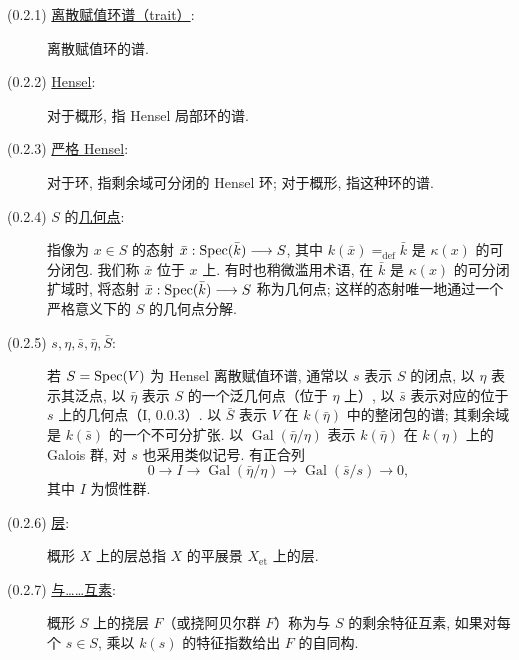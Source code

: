 \begin{description}
\item[(0.2.1) \underline{离散赋值环谱（trait）}:]
离散赋值环的谱.

\item[(0.2.2) \underline{Hensel}:]
对于概形, 指 Hensel 局部环的谱.

\item[(0.2.3) \underline{严格 Hensel}:]
对于环, 指剩余域可分闭的 Hensel 环; 对于概形, 指这种环的谱.

\item[(0.2.4) $S$ 的\underline{几何点}:]
指像为 $x\in S$ 的态射 $\bar x:\operatorname{Spec}(\bar k)\longrightarrow S$, 其中 $k(\bar x)=_{\mathrm{def}}\bar k$ 是 $\kappa(x)$ 的可分闭包. 我们称 $\bar x$ 位于 $x$ 上. 有时也稍微滥用术语, 在 $\bar k$ 是 $\kappa(x)$ 的可分闭扩域时, 将态射 $\bar x:\operatorname{Spec}(\bar k)\longrightarrow S$ 称为几何点; 这样的态射唯一地通过一个严格意义下的 $S$ 的几何点分解.

\item[(0.2.5) $s,\eta,\bar s,\bar\eta,\bar S$:]
若 $S=\operatorname{Spec}(V)$ 为 Hensel 离散赋值环谱, 通常以 $s$ 表示 $S$ 的闭点, 以 $\eta$ 表示其泛点, 以 $\bar\eta$ 表示 $S$ 的一个泛几何点（位于 $\eta$ 上）, 以 $\bar s$ 表示对应的位于 $s$ 上的几何点（I, 0.0.3）. 以 $\bar S$ 表示 $V$ 在 $k(\bar\eta)$ 中的整闭包的谱; 其剩余域是 $k(\bar s)$ 的一个不可分扩张. 以 $\operatorname{Gal}(\bar\eta/\eta)$ 表示 $k(\bar\eta)$ 在 $k(\eta)$ 上的 Galois 群, 对 $s$ 也采用类似记号. 有正合列
\begin{equation*}
0\longrightarrow I\longrightarrow
\operatorname{Gal}(\bar\eta/\eta)\longrightarrow
\operatorname{Gal}(\bar s/s)\longrightarrow0,
\end{equation*}
其中 $I$ 为惯性群.

\item[(0.2.6) \underline{层}:]
概形 $X$ 上的层总指 $X$ 的平展景 $X_{\mathrm{et}}$ 上的层.

\item[(0.2.7) \underline{与……互素}:]
概形 $S$ 上的挠层 $F$（或挠阿贝尔群 $F$）称为与 $S$ 的剩余特征互素, 如果对每个 $s\in S$, 乘以 $k(s)$ 的特征指数给出 $F$ 的自同构.
\end{description}
